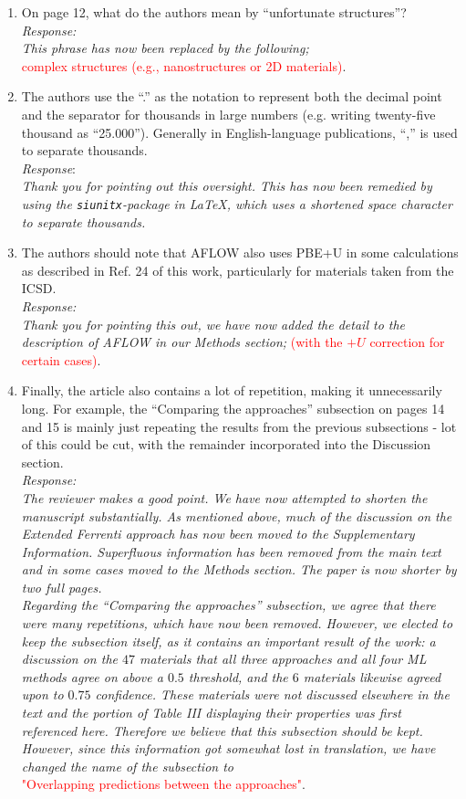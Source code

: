 \documentclass[11pt, a4paper]{letter} %
\newcommand{\mrk}[1]{\textcolor{red}{#1}}
\begin{document}
\begin{enumerate}
    \item On page 12, what do the authors mean by “unfortunate structures”? \\ 
    \textit{Response:} \\ 
    \textit{This phrase has now been replaced by the following;} \\ 
    \mrk{complex structures (e.g., nanostructures or 2D materials)}. 
    \item The authors use the “.” as the notation to represent both the decimal point and the separator for thousands in large numbers (e.g. writing twenty-five thousand as “25.000”). Generally in English-language publications, “,” is used to separate thousands. \\ 
    \textit{Response}: \\
    \textit{Thank you for pointing out this oversight.
    This has now been remedied by using the \texttt{siunitx}-package in \LaTeX, which uses a shortened space character to separate thousands.
    }
    \item The authors should note that AFLOW also uses PBE+U in some calculations as described in Ref. 24 of this work, particularly for materials taken from the ICSD. \\
    \textit{Response:} \\ 
    \textit{Thank you for pointing this out, we have now added the detail to the description of AFLOW in our Methods section;} \mrk{(with the $+U$ correction for certain cases)}. 
    \item Finally, the article also contains a lot of repetition, making it unnecessarily long. For example, the “Comparing the approaches” subsection on pages 14 and 15 is mainly just repeating the results from the previous subsections - lot of this could be cut, with the remainder incorporated into the Discussion section. \\ 
    \textit{Response:} \\ 
    \textit{The reviewer makes a good point. We have now attempted to shorten the manuscript substantially. As mentioned above, much of the discussion on the Extended Ferrenti approach has now been moved to the Supplementary Information. Superfluous information has been removed from the main text and in some cases moved to the Methods section. The paper is now shorter by two full pages.} \\ 
    \textit{Regarding the “Comparing the approaches” subsection, we agree that there were many repetitions, which have now been removed. However, we elected to keep the subsection itself, as it  contains an important result of the work: a discussion on the $47$ materials that all three approaches and all four ML methods agree on above a $0.5$ threshold, and the $6$ materials likewise agreed upon to $0.75$ confidence. These materials were not discussed elsewhere in the text and the portion of Table III displaying their properties was first referenced here. Therefore we believe that this subsection should be kept. However, since this information got somewhat lost in translation, we have changed the name of the subsection to} \\ 
    \mrk{"Overlapping predictions between the approaches"}. 
\end{enumerate}
\end{document}
